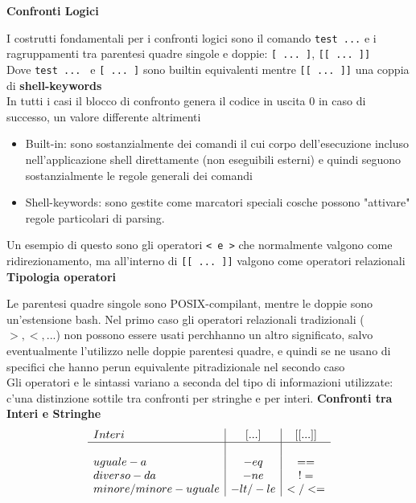 \begin{flushleft}
  \textbf{Confronti Logici}\par 
  I costrutti fondamentali per i confronti logici sono il comando \texttt{test ...} e i 
  ragruppamenti tra parentesi quadre singole e doppie: \texttt{[ ... ]}, \texttt{[[ ... ]]}\\
  Dove \texttt{test ... } e \texttt{[ ... ]} sono builtin equivalenti mentre 
  \texttt{[[ ... ]]} \ace una coppia di \textbf{shell-keywords} \\
  In tutti i casi il blocco di confronto  genera il codice in uscita 0 in caso di successo, un 
  valore differente altrimenti\par 
  \begin{itemize}
    \item Built-in: sono sostanzialmente dei comandi il cui corpo dell'esecuzione  \ace incluso 
          nell'applicazione shell direttamente (non eseguibili esterni) e quindi seguono sostanzialmente 
          le regole generali dei comandi 
    \item Shell-keywords: sono gestite come marcatori speciali cos\aci che possono 
          "attivare" regole particolari di parsing.
  \end{itemize}
  Un esempio di questo sono gli operatori \texttt{< e >} che normalmente valgono 
  come ridirezionamento, ma all'interno di \texttt{[[ ... ]]} valgono come operatori relazionali\\
  \textbf{Tipologia operatori}\par 
  Le parentesi quadre singole sono POSIX-compilant, mentre le doppie sono un'estensione bash. 
  Nel primo caso gli operatori relazionali tradizionali ($>,<,...$) non possono essere 
  usati perch\ace hanno un altro significato, salvo eventualmente l'utilizzo nelle doppie parentesi quadre, 
  e quindi se ne usano di specifici che hanno per\aco un equivalente pi\acu tradizionale nel secondo caso\\
  Gli operatori e le sintassi variano a seconda del tipo di informazioni utilizzate: c'\ace una 
  distinzione sottile tra confronti per stringhe e per interi.
  \textbf{Confronti tra Interi e Stringhe}
  $$\begin{array}{l|c|c}
    Interi & [...] & [[...]] \\
    \hline & \\
    uguale-a & -eq & == \\
    diverso-da & -ne & != \\
    minore/minore-uguale & -lt / -le & < / <= \\

\end{array}$$
\end{flushleft}
